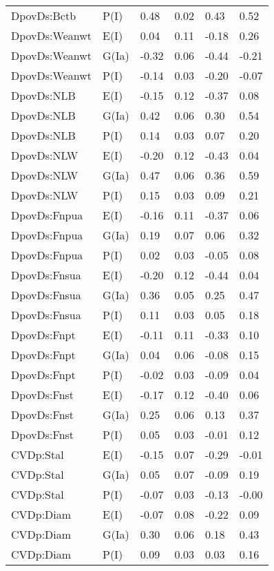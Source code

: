 \begin{center}
\begin{longtable}{|p{1.1in}|p{0.7in}|p{0.7in}|p{0.6in}|p{0.6in}|p{0.6in}|}
  DpovDs:Bctb & P(I) & 0.48 & 0.02 & 0.43 & 0.52 \\ 
  DpovDs:Weanwt & E(I) & 0.04 & 0.11 & -0.18 & 0.26 \\ 
  DpovDs:Weanwt & G(Ia) & -0.32 & 0.06 & -0.44 & -0.21 \\ 
  DpovDs:Weanwt & P(I) & -0.14 & 0.03 & -0.20 & -0.07 \\ 
  DpovDs:NLB & E(I) & -0.15 & 0.12 & -0.37 & 0.08 \\ 
  DpovDs:NLB & G(Ia) & 0.42 & 0.06 & 0.30 & 0.54 \\ 
  DpovDs:NLB & P(I) & 0.14 & 0.03 & 0.07 & 0.20 \\ 
  DpovDs:NLW & E(I) & -0.20 & 0.12 & -0.43 & 0.04 \\ 
  DpovDs:NLW & G(Ia) & 0.47 & 0.06 & 0.36 & 0.59 \\ 
  DpovDs:NLW & P(I) & 0.15 & 0.03 & 0.09 & 0.21 \\ 
  DpovDs:Fnpua & E(I) & -0.16 & 0.11 & -0.37 & 0.06 \\ 
  DpovDs:Fnpua & G(Ia) & 0.19 & 0.07 & 0.06 & 0.32 \\ 
  DpovDs:Fnpua & P(I) & 0.02 & 0.03 & -0.05 & 0.08 \\ 
  DpovDs:Fnsua & E(I) & -0.20 & 0.12 & -0.44 & 0.04 \\ 
  DpovDs:Fnsua & G(Ia) & 0.36 & 0.05 & 0.25 & 0.47 \\ 
  DpovDs:Fnsua & P(I) & 0.11 & 0.03 & 0.05 & 0.18 \\ 
  DpovDs:Fnpt & E(I) & -0.11 & 0.11 & -0.33 & 0.10 \\ 
  DpovDs:Fnpt & G(Ia) & 0.04 & 0.06 & -0.08 & 0.15 \\ 
  DpovDs:Fnpt & P(I) & -0.02 & 0.03 & -0.09 & 0.04 \\ 
  DpovDs:Fnst & E(I) & -0.17 & 0.12 & -0.40 & 0.06 \\ 
  DpovDs:Fnst & G(Ia) & 0.25 & 0.06 & 0.13 & 0.37 \\ 
  DpovDs:Fnst & P(I) & 0.05 & 0.03 & -0.01 & 0.12 \\ 
  CVDp:Stal & E(I) & -0.15 & 0.07 & -0.29 & -0.01 \\ 
  CVDp:Stal & G(Ia) & 0.05 & 0.07 & -0.09 & 0.19 \\ 
  CVDp:Stal & P(I) & -0.07 & 0.03 & -0.13 & -0.00 \\ 
  CVDp:Diam & E(I) & -0.07 & 0.08 & -0.22 & 0.09 \\ 
  CVDp:Diam & G(Ia) & 0.30 & 0.06 & 0.18 & 0.43 \\ 
  CVDp:Diam & P(I) & 0.09 & 0.03 & 0.03 & 0.16 \\ 

\end{longtable}
\end{center}
